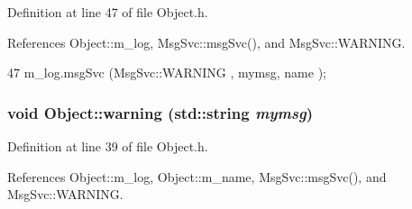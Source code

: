 Definition at line 47 of file Object.h.

References Object::m\_\-log, MsgSvc::msgSvc(), and MsgSvc::WARNING.


\begin{DoxyCode}
47 { m_log.msgSvc (MsgSvc::WARNING , mymsg, name ); }
\end{DoxyCode}
\hypertarget{classObject_a65cd4fda577711660821fd2cd5a3b4c9}{
\subsubsection[{warning}]{\setlength{\rightskip}{0pt plus 5cm}void Object::warning (std::string {\em mymsg})}}
\label{classObject_a65cd4fda577711660821fd2cd5a3b4c9}


Definition at line 39 of file Object.h.

References Object::m\_\-log, Object::m\_\-name, MsgSvc::msgSvc(), and MsgSvc::WARNING.

